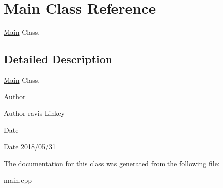 \hypertarget{classMain}{}\section{Main Class Reference}
\label{classMain}


\mbox{\hyperlink{classMain}{Main}} Class.  




\subsection{Detailed Description}
\mbox{\hyperlink{classMain}{Main}} Class. 

\begin{DoxyAuthor}{Author}

\end{DoxyAuthor}
\begin{DoxyParagraph}{Author}
ravis Linkey 
\end{DoxyParagraph}


\begin{DoxyDate}{Date}

\end{DoxyDate}
\begin{DoxyParagraph}{Date}
2018/05/31 
\end{DoxyParagraph}


The documentation for this class was generated from the following file\+:\begin{DoxyCompactItemize}
\item 
main.\+cpp\end{DoxyCompactItemize}
